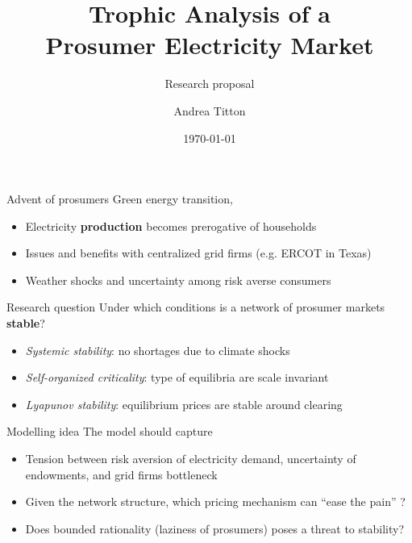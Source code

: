 \documentclass[xcolor={svgnames}]{beamer}
\title[Trophic analysis of Electricity markets]{Trophic Analysis of a\\ Prosumer Electricity Market}
\subtitle{Research proposal}
\author{Andrea Titton}
\institute{Tinbergen Institute}
\date{\today}
\begin{document}
\frame{\titlepage}

\begin{frame}{Advent of prosumers}
    Green energy transition,
    \begin{itemize}\setlength\itemsep{1em}
        \item Electricity \textbf{production} becomes prerogative of households
        \item Issues and benefits with centralized grid firms (e.g. ERCOT in Texas)
        \item Weather shocks and uncertainty among risk averse consumers
    \end{itemize}
\end{frame}

\begin{frame}{Research question}
    Under which conditions is a network of prosumer markets \textbf{stable}?

    \begin{itemize} \setlength\itemsep{1em}
        \item \textit{Systemic stability}: no shortages due to climate shocks
        \item \textit{Self-organized criticality}: type of equilibria are scale invariant \nocite{Bak1995}
        \item \textit{Lyapunov stability}: equilibrium prices are stable around clearing
    \end{itemize}
\end{frame}

\begin{frame}{Modelling idea}
    The model should capture
    \begin{itemize}\setlength\itemsep{1em}
        \item Tension between risk aversion of electricity demand, uncertainty of endowments, and grid firms bottleneck
        \item Given the network structure, which pricing mechanism can ``ease the pain'' ?
        \item Does bounded rationality (laziness of prosumers) poses a threat to stability?
    \end{itemize}
\end{frame}
\end{document}
